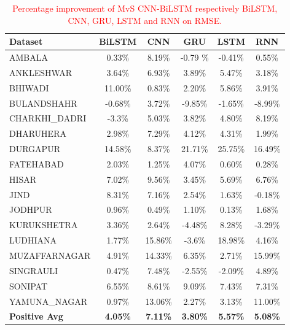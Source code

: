 \documentclass[a4paper, fleqn]{cas-sc}
\theoremstyle{definition}
\theoremstyle{remark}
\begin{document}
  \begin{table}[]
    \caption{\textcolor{red}{Percentage improvement of MvS CNN-BiLSTM respectively BiLSTM,  CNN,  GRU,  LSTM and RNN on RMSE.}}
    \label{RMSE imp}
    \begin{tabular}{lccccc}
    \hline    Dataset        &   BiLSTM &   CNN &   GRU &   LSTM &   RNN \\ \hline
    AMBALA & 0.33\% & 8.19\% & -0.79 \% & -0.41\% & 0.55\% \\
    ANKLESHWAR & 3.64\% & 6.93\% & 3.89\% & 5.47\% & 3.18\% \\
    BHIWADI & 11.00\% & 0.83\% & 2.20\% & 5.86\% & 3.91\% \\
    BULANDSHAHR & -0.68\% & 3.72\% & -9.85\% & -1.65\% & -8.99\% \\
    CHARKHI\_DADRI &-3.3\% & 5.03\% & 3.82\% & 4.80\% & 8.19\% \\
    DHARUHERA & 2.98\% & 7.29\% & 4.12\% & 4.31\% & 1.99\% \\
    DURGAPUR & 14.58\% & 8.37\% & 21.71\% & 25.75\% & 16.49\% \\
    FATEHABAD & 2.03\% & 1.25\% & 4.07\% & 0.60\% & 0.28\% \\
    HISAR & 7.02\% & 9.56\% & 3.45\% & 5.69\% & 6.76\% \\
    JIND & 8.31\% & 7.16\% & 2.54\% & 1.63\% & -0.18\% \\
    JODHPUR & 0.96\% & 0.49\% & 1.10\% & 0.13\% & 1.68\% \\
    KURUKSHETRA & 3.36\% & 2.64\% & -4.48\% & 8.28\% & -3.29\% \\
    LUDHIANA & 1.77\% & 15.86\% & -3.6\% & 18.98\% & 4.16\% \\
    MUZAFFARNAGAR & 4.91\% & 14.33\% & 6.35\% & 2.71\% & 15.99\% \\
    SINGRAULI & 0.47\% & 7.48\% & -2.55\% & -2.09\% & 4.89\% \\
    SONIPAT & 6.55\% & 8.61\% & 9.09\% & 7.43\% & 7.31\% \\
    YAMUNA\_NAGAR & 0.97\% & 13.06\% & 2.27\% & 3.13\% & 11.00\% \\ \hline
    \textbf{Positive Avg}  & \textbf{4.05\%} & \textbf{7.11\%}& \textbf{3.80\%} & \textbf{5.57\%} & \textbf{5.08\%} \\ \hline
    \end{tabular}
    \end{table}
\end{document}
